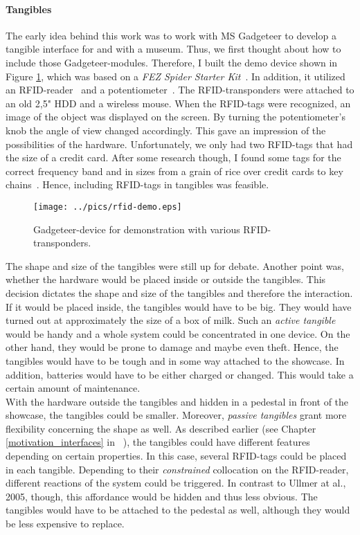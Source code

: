 \paragraph{Tangibles} 

The early idea behind this work was to work with \ac{MS} Gadgeteer to develop a tangible interface for and with a museum. Thus, we first thought about how to include those Gadgeteer-modules. Therefore, I built the demo device shown in Figure \ref{fig:gadgeteer-demo}, which was based on a \textit{FEZ Spider Starter Kit}~\cite{SpiderKitGHI}. In addition, it utilized an \ac{RFID}-reader~\cite{RFIDreaderGHI} and a potentiometer~\cite{PotentiometerGHI}. The RFID-transponders were attached to an old 2,5" \ac{HDD} and a wireless mouse. When the \ac{RFID}-tags were recognized, an image of the object was displayed on the screen. By turning the potentiometer's knob the angle of view changed accordingly. This gave an impression of the possibilities of the hardware. Unfortunately, we only had two \ac{RFID}-tags that had the size of a credit card. After some research though, I found some tags for the correct frequency band and in sizes from a grain of rice over credit cards to key chains~\cite{RFIDtransponder}. Hence, including \ac{RFID}-tags in tangibles was feasible. 
\begin{figure}[H]%
\texttt{[image: ../pics/rfid-demo.eps]}%
\caption{Gadgeteer-device for demonstration with various \ac{RFID}-transponders.}%
\label{fig:gadgeteer-demo} 
\end{figure}

The shape and size of the tangibles were still up for debate. Another point was, whether the hardware would be placed inside or outside the tangibles. This decision dictates the shape and size of the tangibles and therefore the interaction. If it would be placed inside, the tangibles would have to be big. They would have turned out at approximately the size of a box of milk. Such an \textit{active tangible} would be handy and a whole system could be concentrated in one device. On the other hand, they would be prone to damage and maybe even theft. Hence, the tangibles would have to be tough and in some way attached to the showcase. In addition, batteries would have to be either charged or changed. This would take a certain amount of maintenance.
\\
With the hardware outside the tangibles and hidden in a pedestal in front of the showcase, the tangibles could be smaller. Moreover, \textit{passive tangibles} grant more flexibility concerning the shape as well. As described earlier (see Chapter \ref{motivation_interfaces} in ~\cite{TangibleUI}), the tangibles could have different features depending on certain properties. In this case, several \ac{RFID}-tags could be placed in each tangible. Depending to their \textit{constrained} collocation on the \ac{RFID}-reader, different reactions of the system could be triggered. In contrast to Ullmer at al., 2005, though, this affordance would be hidden and thus less obvious. The tangibles would have to be attached to the pedestal as well, although they would be less expensive to replace.

